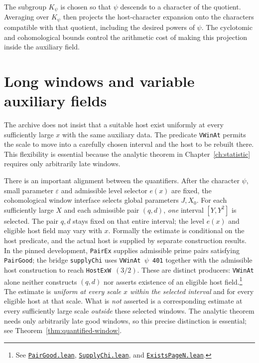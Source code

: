 \documentclass[11pt,openany,oneside]{scrbook}
\theoremstyle{definition}
\theoremstyle{remark}
\newcommand{\eps}{\varepsilon}
\newcommand{\baseurl}{https://github.com/CocoSgt/riemann-hypothesis-lean/blob/7cbf7a0c32fca1badf05931879a37c3f8a2b03b4/}
\newcommand{\sourcefile}[2]{\href{\baseurl#1}{\texttt{#2}}}
\begin{document}
The subgroup $K_\psi$ is chosen so that $\psi$ descends to a character of the quotient. Averaging over $K_\psi$ then projects the host-character expansion onto the characters compatible with that quotient, including the desired powers of $\psi$. The cyclotomic and cohomological bounds control the arithmetic cost of making this projection inside the auxiliary field.

\section{Long windows and variable auxiliary fields}

The archive does not insist that a suitable host exist uniformly at every sufficiently large $x$ with the same auxiliary data. The predicate \texttt{VWinAt} permits the scale to move into a carefully chosen interval and the host to be rebuilt there. This flexibility is essential because the analytic theorem in Chapter~\ref{ch:statistic} requires only arbitrarily late windows.

There is an important alignment between the quantifiers. After the character $\psi$, small parameter $\eps$ and admissible level selector $e(x)$ are fixed, the cohomological window interface selects global parameters $J,X_0$. For each sufficiently large $X$ and each admissible pair $(q,d)$, \emph{one} interval $[Y,Y^2]$ is selected. The pair $q,d$ stays fixed on that entire interval; the level $e(x)$ and eligible host field may vary with $x$. Formally the estimate is conditional on the host predicate, and the actual host is supplied by separate construction results. In the pinned development, \texttt{PairEx} supplies admissible prime pairs satisfying \texttt{PairGood}; the bridge \texttt{supplyChi} uses \texttt{VWinAt $\psi$ 401} together with the admissible host construction to reach \texttt{HostExW $(3/2)$}. These are distinct producers: \texttt{VWinAt} alone neither constructs $(q,d)$ nor asserts existence of an eligible host field.\footnote{See \sourcefile{src/Development/AutomorphicArithmetic/CharacterBoxes/PairGood.lean}{PairGood.lean}, \sourcefile{src/Development/AutomorphicArithmetic/CharacterBoxes/SupplyChi.lean}{SupplyChi.lean}, and \sourcefile{src/Development/AutomorphicArithmetic/CharacterBoxes/ExistsPageN.lean}{ExistsPageN.lean}.} The estimate is \emph{uniform at every scale $x$ within the selected interval} and for every eligible host at that scale. What is \emph{not} asserted is a corresponding estimate at every sufficiently large scale \emph{outside} these selected windows. The analytic theorem needs only arbitrarily late good windows, so this precise distinction is essential; see Theorem~\ref{thm:quantified-window}.
\end{document}
